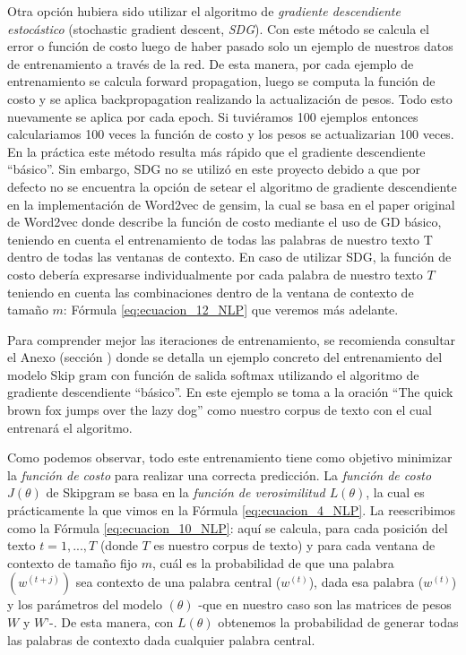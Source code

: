 \documentclass[12pt,a4paper]{article}
\begin{document}
\begin{sloppypar}
\begin{enumerate}
\end{enumerate}

Otra opción hubiera sido utilizar el algoritmo de \textit{gradiente descendiente estocástico} (stochastic gradient descent, \textit{SDG}). Con este método se calcula el error o función de costo luego de haber pasado solo un ejemplo de nuestros datos de entrenamiento a través de la red. De esta manera, por cada ejemplo de entrenamiento se calcula forward propagation, luego se computa la función de costo y se aplica backpropagation realizando la actualización de pesos. Todo esto nuevamente se aplica por cada epoch. Si tuviéramos 100 ejemplos entonces calculariamos 100 veces la función de costo y los pesos se actualizarian 100 veces. En la práctica este método resulta más rápido que el gradiente descendiente “básico”.  Sin embargo, SDG no se utilizó en este proyecto debido a que por defecto no se encuentra la opción de setear el algoritmo de gradiente descendiente en la implementación de Word2vec de gensim, la cual se basa en el paper original de Word2vec\cite{NLP_11} donde describe la función de costo mediante el uso de GD básico, teniendo en cuenta el entrenamiento de todas las palabras de nuestro texto T dentro de todas las ventanas de contexto. En caso de utilizar SDG, la función de costo debería expresarse individualmente por cada palabra de nuestro texto $T$ teniendo en cuenta las combinaciones dentro de la ventana de contexto de tamaño $m$: Fórmula \ref{eq:ecuacion_12_NLP} que veremos más adelante.

Para comprender mejor las iteraciones de entrenamiento, se recomienda consultar el Anexo (sección \textit{}) donde se detalla un ejemplo concreto del entrenamiento del modelo Skip gram con función de salida softmax utilizando el algoritmo de gradiente descendiente “básico”. En este ejemplo se toma a la oración “The quick brown fox jumps over the lazy dog” como nuestro corpus de texto con el cual entrenará el algoritmo.

Como podemos observar, todo este entrenamiento tiene como objetivo minimizar la \textit{función de costo} para realizar una correcta predicción. La \textit{función de costo $J(\theta)$} de Skipgram se basa en la \textit{función de verosimilitud $L(\theta)$}, la cual es prácticamente la que vimos en la Fórmula \ref{eq:ecuacion_4_NLP}. La reescribimos como la Fórmula \ref{eq:ecuacion_10_NLP}: aquí se calcula, para cada posición del texto $t = 1, ..., T$ (donde $T$ es nuestro corpus de texto) y para cada ventana de contexto de tamaño fijo $m$, cuál es la probabilidad de que una palabra $(w^{(t+j)})$ sea contexto de una palabra central ($w^{(t)}$), dada esa palabra ($w^{(t)}$) y los parámetros del modelo $(\theta)$ -que en nuestro caso son las matrices de pesos $W$ y $W’$-. De esta manera, con $L(\theta)$ obtenemos la probabilidad de generar todas las palabras de contexto dada cualquier palabra central.


\end{sloppypar}
\end{document}

